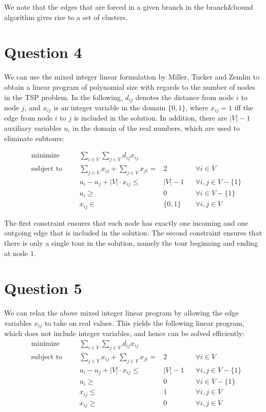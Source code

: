 \documentclass[a4paper, 10pt, oneside, article]{memoir}
\begin{document}
We note that the edges that are forced in a given branch in the
branch\&bound algorithm gives rise to a set of clusters.


\section*{Question 4}

We can use the mixed integer linear formulation by Miller, Tucker and
Zemlin to obtain a linear program of polynomial size with regards to
the number of nodes in the TSP problem. In the following, $d_{ij}$
denotes the distance from node $i$ to node $j$, and $x_{ij}$ is an
integer variable in the domain $\{0, 1\}$, where $x_{ij} = 1$ iff the
edge from node $i$ to $j$ is included in the solution. In addition,
there are $|V|-1$ auxiliary variables $u_i$ in the domain of the real
numbers, which are used to eliminate subtours:

\begin{align*}
  &\text{minimize} &&& \sum_{i\in V} \sum_{j \in V} d_{ij} x_{ij} \\
  &\text{subject to} &&& \sum_{j \in V} x_{ij} + \sum_{j \in V} x_{ji} ={}& 2 && \forall i \in V \\
  &                  &&& u_i - u_j + |V| \cdot x_{ij} \leq{}& |V| - 1 && \forall i,j \in V - \{1\}  \\
  &                  &&& u_i \geq{}& 0 && \forall i \in V - \{1\} \\
  &                  &&& x_{ij} \in{}& \{0, 1\} && \forall i,j \in V
\end{align*}

The first constraint ensures that each node has exactly one incoming
and one outgoing edge that is included in the solution. The second
constraint ensures that there is only a single tour in the solution,
namely the tour beginning and ending at node $1$.


\section*{Question 5}

We can relax the above mixed integer linear program by allowing the
edge variables $x_{ij}$ to take on real values. This yields the
following linear program, which does not include integer variables,
and hence can be solved efficiently:
\begin{align*}
  &\text{minimize} &&& \sum_{i\in V} \sum_{j \in V} d_{ij} x_{ij} \\
  &\text{subject to} &&& \sum_{j \in V} x_{ij} + \sum_{j \in V} x_{ji} ={}& 2 && \forall i \in V \\
  &                  &&& u_i - u_j + |V| \cdot x_{ij} \leq{}& |V| - 1 && \forall i,j \in V - \{1\}  \\
  &                  &&& u_i \geq{}& 0 && \forall i \in V - \{1\} \\
  &                  &&& x_{ij} \leq{}& 1 && \forall i,j \in V \\
  &                  &&& x_{ij} \geq{}& 0 && \forall i,j \in V
\end{align*}
\end{document}
